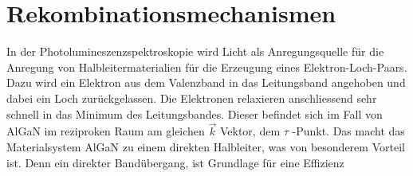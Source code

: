
\thispagestyle{fancy}


\section{Rekombinationsmechanismen}

In der Photolumineszenzspektroskopie wird Licht als Anregungsquelle für die Anregung von Halbleitermaterialien für die Erzeugung eines Elektron-Loch-Paars. Dazu wird ein Elektron aus dem Valenzband in das Leitungsband angehoben und dabei ein Loch zurückgelassen. Die Elektronen relaxieren anschliessend sehr schnell in das Minimum des Leitungsbandes. Dieser befindet sich im Fall von AlGaN im reziproken Raum am gleichen $\vec{k}$ Vektor, dem $\tau$ -Punkt. Das macht das Materialsystem AlGaN zu einem direkten Halbleiter, was von besonderem Vorteil ist. Denn ein direkter Bandübergang, ist Grundlage für eine Effizienz 